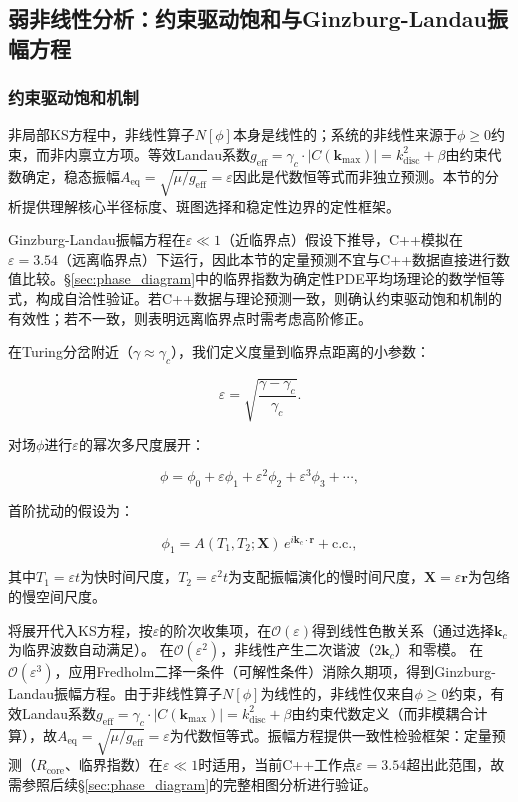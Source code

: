 \documentclass[sn-nature,pdflatex]{sn-jnl}
\begin{document}
\subsection{弱非线性分析：约束驱动饱和与Ginzburg-Landau振幅方程}

\subsubsection{约束驱动饱和机制}

非局部KS方程中，非线性算子$N[\phi]$本身是线性的；系统的非线性来源于$\phi \ge 0$约束，而非内禀立方项。等效Landau系数$g_{\text{eff}} = \gamma_c \cdot |C(\mathbf{k}_{\max})| = k^2_{\text{disc}} + \beta$由约束代数确定，稳态振幅$A_{\text{eq}} = \sqrt{\mu/g_{\text{eff}}} = \varepsilon$因此是代数恒等式而非独立预测。本节的分析提供理解核心半径标度、斑图选择和稳定性边界的定性框架。

Ginzburg-Landau振幅方程在$\varepsilon \ll 1$（近临界点）假设下推导，C++模拟在$\varepsilon = 3.54$（远离临界点）下运行，因此本节的定量预测不宜与C++数据直接进行数值比较。§\ref{sec:phase_diagram}中的临界指数为确定性PDE平均场理论的数学恒等式，构成自洽性验证。若C++数据与理论预测一致，则确认约束驱动饱和机制的有效性；若不一致，则表明远离临界点时需考虑高阶修正。

在Turing分岔附近（$\gamma \approx \gamma_c$），我们定义度量到临界点距离的小参数：

\begin{equation}
\varepsilon = \sqrt{\frac{\gamma - \gamma_c}{\gamma_c}}.
\end{equation}

对场$\phi$进行$\varepsilon$的幂次多尺度展开：

\begin{equation}
\phi = \phi_0 + \varepsilon \phi_1 + \varepsilon^2 \phi_2 + \varepsilon^3 \phi_3 + \cdots,
\end{equation}

首阶扰动的假设为：

\begin{equation}
\phi_1 = A(T_1, T_2; \mathbf{X}) \, e^{i\mathbf{k}_c \cdot \mathbf{r}} + \text{c.c.},
\end{equation}

其中$T_1 = \varepsilon t$为快时间尺度，$T_2 = \varepsilon^2 t$为支配振幅演化的慢时间尺度，$\mathbf{X} = \varepsilon \mathbf{r}$为包络的慢空间尺度。

将展开代入KS方程，按$\varepsilon$的阶次收集项，在$\mathcal{O}(\varepsilon)$得到线性色散关系（通过选择$\mathbf{k}_c$为临界波数自动满足）。
在$\mathcal{O}(\varepsilon^2)$，非线性产生二次谐波（$2\mathbf{k}_c$）和零模。
在$\mathcal{O}(\varepsilon^3)$，应用Fredholm二择一条件（可解性条件）消除久期项，得到Ginzburg-Landau振幅方程。由于非线性算子$N[\phi]$为线性的，非线性仅来自$\phi \ge 0$约束，有效Landau系数$g_{\text{eff}} = \gamma_c \cdot |C(\mathbf{k}_{\max})| = k^2_{\text{disc}} + \beta$由约束代数定义（而非模耦合计算），故$A_{\text{eq}} = \sqrt{\mu/g_{\text{eff}}} = \varepsilon$为代数恒等式。振幅方程提供一致性检验框架：定量预测（$R_{\text{core}}$、临界指数）在$\varepsilon \ll 1$时适用，当前C++工作点$\varepsilon = 3.54$超出此范围，故需参照后续§\ref{sec:phase_diagram}的完整相图分析进行验证。
\end{document}

